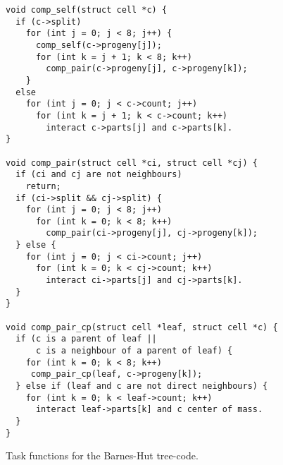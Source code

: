 \documentclass[preprint]{elsarticle}
\begin{document}
\begin{figure}
\begin{center}\begin{minipage}{0.9\textwidth}
    \begin{lstlisting}[basicstyle=\scriptsize\tt]
void comp_self(struct cell *c) {
  if (c->split)
    for (int j = 0; j < 8; j++) {
      comp_self(c->progeny[j]);
      for (int k = j + 1; k < 8; k++)
        comp_pair(c->progeny[j], c->progeny[k]);
    }
  else
    for (int j = 0; j < c->count; j++)
      for (int k = j + 1; k < c->count; k++)
        interact c->parts[j] and c->parts[k].
}

void comp_pair(struct cell *ci, struct cell *cj) {
  if (ci and cj are not neighbours)
    return;
  if (ci->split && cj->split) {
    for (int j = 0; j < 8; j++)
      for (int k = 0; k < 8; k++)
        comp_pair(ci->progeny[j], cj->progeny[k]);
  } else {
    for (int j = 0; j < ci->count; j++)
      for (int k = 0; k < cj->count; k++)
        interact ci->parts[j] and cj->parts[k].
  }
}

void comp_pair_cp(struct cell *leaf, struct cell *c) {
  if (c is a parent of leaf ||
      c is a neighbour of a parent of leaf) {
    for (int k = 0; k < 8; k++)
     comp_pair_cp(leaf, c->progeny[k]);
  } else if (leaf and c are not direct neighbours) {
    for (int k = 0; k < leaf->count; k++)
      interact leaf->parts[k] and c center of mass.
  }
}
    \end{lstlisting}
\end{minipage}\end{center}
    \caption{Task functions for the Barnes-Hut tree-code.}
    \label{fig:BHTasks}
\end{figure}
\end{document}
